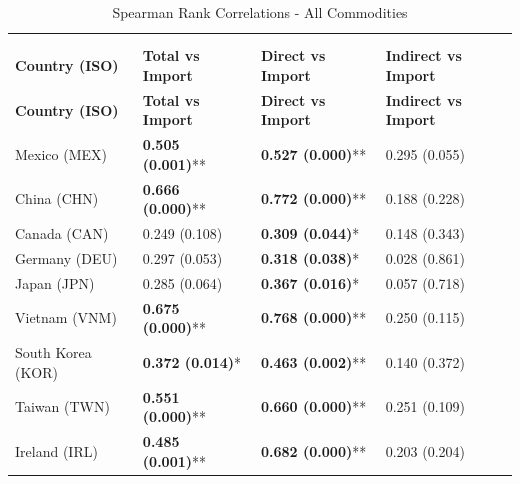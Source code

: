 \begin{longtable}{p{5cm}p{3cm}p{3cm}p{5cm}}
\centering
\caption{Spearman Rank Correlations - All Commodities} \\
\label{tab:Spearman_Rank_Correlations__All_Commodities} \\
\toprule
\textbf{Country (ISO)} & \textbf{Total vs Import} & \textbf{Direct vs Import} & \textbf{Indirect vs Import} \\
\midrule
\endfirsthead

\toprule
\textbf{Country (ISO)} & \textbf{Total vs Import} & \textbf{Direct vs Import} & \textbf{Indirect vs Import} \\
\midrule
\endhead

\bottomrule
\endfoot

\bottomrule
\endlastfoot

Mexico (MEX) & \textcolor{atlLime600}{\textbf{0.505 (0.001)}**} & \textcolor{atlLime600}{\textbf{0.527 (0.000)}**} & \textcolor{atlOrange600}{0.295 (0.055)} \\
China (CHN) & \textcolor{atlLime600}{\textbf{0.666 (0.000)}**} & \textcolor{atlLime600}{\textbf{0.772 (0.000)}**} & \textcolor{atlOrange600}{0.188 (0.228)} \\
Canada (CAN) & \textcolor{atlOrange600}{0.249 (0.108)} & \textcolor{atlLime600}{\textbf{0.309 (0.044)}*} & \textcolor{atlOrange600}{0.148 (0.343)} \\
Germany (DEU) & \textcolor{atlOrange600}{0.297 (0.053)} & \textcolor{atlLime600}{\textbf{0.318 (0.038)}*} & \textcolor{atlOrange600}{0.028 (0.861)} \\
Japan (JPN) & \textcolor{atlOrange600}{0.285 (0.064)} & \textcolor{atlLime600}{\textbf{0.367 (0.016)}*} & \textcolor{atlOrange600}{0.057 (0.718)} \\
Vietnam (VNM) & \textcolor{atlLime600}{\textbf{0.675 (0.000)}**} & \textcolor{atlLime600}{\textbf{0.768 (0.000)}**} & \textcolor{atlOrange600}{0.250 (0.115)} \\
South Korea (KOR) & \textcolor{atlLime600}{\textbf{0.372 (0.014)}*} & \textcolor{atlLime600}{\textbf{0.463 (0.002)}**} & \textcolor{atlOrange600}{0.140 (0.372)} \\
Taiwan (TWN) & \textcolor{atlLime600}{\textbf{0.551 (0.000)}**} & \textcolor{atlLime600}{\textbf{0.660 (0.000)}**} & \textcolor{atlOrange600}{0.251 (0.109)} \\
Ireland (IRL) & \textcolor{atlLime600}{\textbf{0.485 (0.001)}**} & \textcolor{atlLime600}{\textbf{0.682 (0.000)}**} & \textcolor{atlOrange600}{0.203 (0.204)} \\

\end{longtable}
